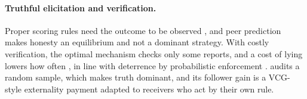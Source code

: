 \paragraph{Truthful elicitation and verification.}
Proper scoring rules need the outcome to be observed \citep{gneiting2007strictly}, and peer prediction \citep{miller2005peer,shnayder2016informed,feng2022peer,gao2019incentivizing} makes honesty an equilibrium and not a dominant strategy. With costly verification, the optimal mechanism checks only some reports, and a cost of lying lowers how often \citep{benporath2014OptimalAllocationCostly}, in line with deterrence by probabilistic enforcement \citep{becker1968crime}. \tvc{} audits a random sample, which makes truth dominant, and its follower gain is a VCG-style externality payment \citep{vickrey1961counterspeculation,clarke1971multipart,groves1973incentives} adapted to receivers who act by their own rule.


